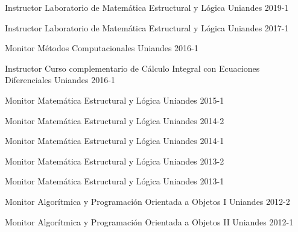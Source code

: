 


\begin{cvhonors}

    \cvhonor
    {Instructor}
    {Laboratorio de Matemática Estructural y Lógica}
    {Uniandes}
    {2019-1}

    \cvhonor
    {Instructor}
    {Laboratorio de Matemática Estructural y Lógica}
    {Uniandes}
    {2017-1}

    \cvhonor
    {Monitor}
    {Métodos Computacionales}
    {Uniandes}
    {2016-1}

    \cvhonor
    {Instructor}
    {Curso complementario de Cálculo Integral con Ecuaciones Diferenciales}
    {Uniandes}
    {2016-1}

    \cvhonor
    {Monitor}
    {Matemática Estructural y Lógica}
    {Uniandes}
    {2015-1}

    \cvhonor
    {Monitor}
    {Matemática Estructural y Lógica}
    {Uniandes}
    {2014-2}

    \cvhonor
    {Monitor}
    {Matemática Estructural y Lógica}
    {Uniandes}
    {2014-1}

    \cvhonor
    {Monitor}
    {Matemática Estructural y Lógica}
    {Uniandes}
    {2013-2}

    \cvhonor
    {Monitor}
    {Matemática Estructural y Lógica}
    {Uniandes}
    {2013-1}

    \cvhonor
    {Monitor}
    {Algorítmica y Programación Orientada a Objetos I}
    {Uniandes}
    {2012-2}

    \cvhonor
    {Monitor}
    {Algorítmica y Programación Orientada a Objetos II}
    {Uniandes}
    {2012-1}

\end{cvhonors}
